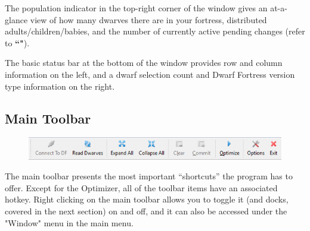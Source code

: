 \documentclass[]{article}
\begin{document}

The population indicator in the top-right corner of the window gives an at-a-glance view of how many
dwarves there are in your fortress, distributed adults/children/babies, and the number of currently
active pending changes (refer to \textbf{``"}).

The basic status bar at the bottom of the window provides row and column information on the left, and a
dwarf selection count and Dwarf Fortress version type information on the right.

\newpage
\subsection{Main Toolbar}
\label{sec:Main Toolbar}
\begin{figure}[h!] \centering \includegraphics[width=\linewidth]{Sec1Fig13}
\end{figure}

The main toolbar presents the most important ``shortcuts'' the program has to offer. Except for the
Optimizer, all of the toolbar items have an associated hotkey. Right clicking on the main toolbar allows
you to toggle it (and docks, covered in the next section) on and off, and it can also be accessed under
the "Window" menu in the main menu.
\end{document}

